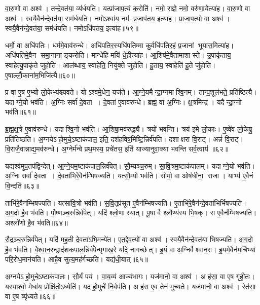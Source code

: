 वा॒रु॒णो वा अश्व॑। तन्दे॒वत॑या॒ व्य॑र्धयति। यत्प्रा॑जाप॒त्यं क॒रोति॑। नमो॒ राज्ञे॒ नमो॒ वरु॑णा॒येत्या॑ह। वा॒रु॒णो वा अश्व॑। स्वयै॒वैन॑न्दे॒वत॑या॒ सम॑र्धयति। नमोऽश्वा॑य॒ नम॑ प्र॒जाप॑तय॒ इत्या॑ह। प्रा॒जा॒प॒त्यो वा अश्व॑। स्वयै॒वैन॑न्दे॒वत॑या॒ सम॑र्धयति। नमोऽधि॑पतय॒ इत्या॑ह॥५९॥

धर्मो॒ वा अधि॑पतिः। धर्म॑मे॒वाव॑रुन्धे। अधि॑पतिर॒स्यधि॑पतिम्मा कु॒र्वधि॑पतिर॒हं प्र॒जानां भूयास॒मित्या॑ह। अधि॑पतिमे॒वैन समा॒नानाङ्करोति। मान्धे॑हि॒ मयि॑ धे॒हीत्या॑ह। आ॒शिष॑मे॒वैतामाशास्ते। उ॒पाकृ॑ताय॒ स्वाहेत्यु॒पाकृ॑ते जुहोति। आल॑ब्धाय॒ स्वाहेति॒ नियु॑क्ते जुहोति। हु॒ताय॒ स्वाहेति॑ हु॒ते जु॑होति। ए॒षाल्लोँ॒काना॑म॒भिजि॑त्यै॥६०॥

प्र वा ए॒ष ए॒भ्यो लो॒केभ्य॑श्च्यवते। योऽश्वमे॒धेन॒ यज॑ते। आ॒ग्ने॒यमैन्द्रा॒ग्नमाश्वि॒नम्। तान्प॒शूल॑भते॒ प्रति॑ष्ठित्यै। यदाग्ने॒यो भव॑ति। अ॒ग्निः सर्वा॑ दे॒वता। दे॒वता॑ ए॒वाव॑रुन्धे। ब्रह्म॒ वा अ॒ग्निः। क्ष॒त्रमिन्द्र॑। यदैन्द्रा॒ग्नो भव॑ति॥६१॥

ब्र॒ह्म॒क्ष॒त्रे ए॒वाव॑रुन्धे। यदाश्वि॒नो भव॑ति। आ॒शिषा॒मव॑रुद्ध्यै। त्रयो॑ भवन्ति। त्रय॑ इ॒मे लो॒काः। ए॒ष्वे॑व लो॒केषु॒ प्रति॑तिष्ठति। अ॒ग्नयेऽहो॒मुचे॒ऽष्टाक॑पाल॒ इति॒ दश॑हविष॒मिष्टि॒न्निर्व॑पति। दशाक्षरा वि॒राट्। अन्नं॑ वि॒राट्। वि॒राजै॒वान्नाद्य॒मव॑रुन्धे। अ॒ग्नेर्म॑न्वे प्रथ॒मस्य॒ प्रचे॑तस॒ इति॑ याज्यानुवा॒क्या॑ भवन्ति सर्व॒त्वाय॑ ॥६२॥\anuvakamend[अधि॑पतय॒ इत्या॑हा॒भि॑जित्या ऐन्द्रा॒ग्नो भव॑ति रुन्ध॒ एकं च]

यद्यश्व॑मुप॒तप॑द्वि॒न्देत्। आ॒ग्ने॒यम॒ष्टाक॑पाल॒न्निर्व॑पेत्। सौ॒म्यञ्च॒रुम्। सा॒वि॒त्रम॒ष्टाक॑पालम्। यदाग्ने॒यो भव॑ति। अ॒ग्निः सर्वा॑ दे॒वता। दे॒वता॑भिरे॒वैन॑म्भिषज्यति। यत्सौ॒म्यो भव॑ति। सोमो॒ वा ओष॑धीना॒ राजा। याभ्य॑ ए॒वैनं वि॒न्दति॑॥६३॥

ताभि॑रे॒वैन॑म्भिषज्यति। यत्सा॑वि॒त्रो भव॑ति। स॒वि॒तृप्र॑सूत ए॒वैन॑म्भिषज्यति। ए॒ताभि॑रे॒वैन॑न्दे॒वता॑भिर्भिषज्यति। अ॒ग॒दो है॒व भ॑वति। पौ॒ष्णञ्च॒रुन्निर्व॑पेत्। यदि॑ श्लो॒णः स्यात्। पू॒षा वै श्लौण्य॑स्य भि॒षक्। स ए॒वैन॑म्भिषज्यति। अश्लो॑णो है॒व भ॑वति॥६४॥

रौ॒द्रञ्च॒रुन्निर्व॑पेत्। यदि॑ मह॒ती दे॒वता॑ऽभि॒मन्ये॑त। ए॒त॒द्दे॒व॒त्यो॑ वा अश्व॑। स्वयै॒वैन॑न्दे॒वत॑या भिषज्यति। अ॒ग॒दो है॒व भ॑वति। वै॒श्वा॒न॒रन्द्वाद॑शकपाल॒न्निर्व॑पेन्मृगाख॒रे यदि॒ नागच्छेत्। इ॒यं वा अ॒ग्निर्वैश्वान॒रः। इ॒यमे॒वैन॑म॒र्चिभ्यां परि॒रोध॒मान॑यति। आहै॒व सुत्य॒मह॑र्गच्छति। यद्य॑धी॒यात्॥६५॥

अ॒ग्नयेऽहो॒मुचे॒ऽष्टाक॑पालः। सौ॒र्यं पय॑। वा॒य॒व्य॑ आज्य॑भागः। यज॑मानो॒ वा अश्व॑। अह॑सा॒ वा ए॒ष गृ॑ही॒तः। यस्याश्वो॒ मेधा॑य॒ प्रोक्षि॑तो॒ऽध्येति॑। यदहो॒मुचे॑ नि॒र्वप॑ति। अह॑स ए॒व तेन॑ मुच्यते। यज॑मानो॒ वा अश्व॑। रेत॑सा॒ वा ए॒ष व्यृ॑ध्यते॥६६॥

